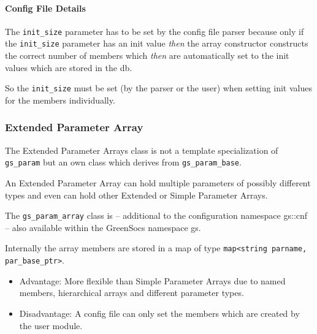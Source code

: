 \paragraph{Config File Details}

The \lstinline|init_size| parameter has to be set by the config file parser because only if the \lstinline|init_size| parameter has an init value {\em then} the array constructor constructs the correct number of members which {\em then} are automatically set to the init values which are stored in the db.

So the \lstinline|init_size| must be set (by the parser or the user) when setting init values for the members individually.


\subsubsection{Extended Parameter Array}
\label{ExtendedParameterArray}

The Extended Parameter Arrays class is not a template specialization of \lstinline|gs_param| but an own class which derives from \lstinline|gs_param_base|.

An Extended Parameter Array can hold multiple parameters of possibly different types and even can hold other Extended or Simple Parameter Arrays.

The \lstinline|gs_param_array| class is -- additional to the configuration namespace {\sffamily gs::cnf} -- also available within the GreenSocs namespace {\sffamily gs}.

Internally the array members are stored in a map of type \lstinline|map<string parname, par_base_ptr>|.
\begin{itemize}
  \item Advantage: More flexible than Simple Parameter Arrays due to named members, hierarchical arrays and different parameter types.
  \item Disadvantage: A config file can only set the members which are created by the user module.
\end{itemize}

